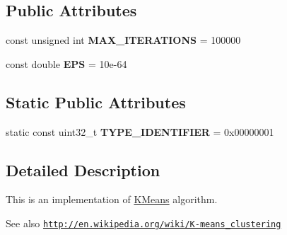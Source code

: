 \subsection*{Public Attributes}
\begin{DoxyCompactItemize}
\item 
\hypertarget{classspeech_1_1clustering_1_1KMeans_a23ff9ad53e6d3db5d933ca6369d36ebe}{const unsigned int {\bfseries M\+A\+X\+\_\+\+I\+T\+E\+R\+A\+T\+I\+O\+N\+S} = 100000}\label{classspeech_1_1clustering_1_1KMeans_a23ff9ad53e6d3db5d933ca6369d36ebe}

\item 
\hypertarget{classspeech_1_1clustering_1_1KMeans_a51592e6258feb92faf71ed61a083596a}{const double {\bfseries E\+P\+S} = 10e-\/64}\label{classspeech_1_1clustering_1_1KMeans_a51592e6258feb92faf71ed61a083596a}

\end{DoxyCompactItemize}
\subsection*{Static Public Attributes}
\begin{DoxyCompactItemize}
\item 
\hypertarget{classspeech_1_1clustering_1_1KMeans_a2643066179760a8455dc118e860a9c5d}{static const uint32\+\_\+t {\bfseries T\+Y\+P\+E\+\_\+\+I\+D\+E\+N\+T\+I\+F\+I\+E\+R} = 0x00000001}\label{classspeech_1_1clustering_1_1KMeans_a2643066179760a8455dc118e860a9c5d}

\end{DoxyCompactItemize}


\subsection{Detailed Description}
This is an implementation of \hyperlink{classspeech_1_1clustering_1_1KMeans}{K\+Means} algorithm. \begin{DoxySeeAlso}{See also}
\href{http://en.wikipedia.org/wiki/K-means_clustering}{\tt http\+://en.\+wikipedia.\+org/wiki/\+K-\/means\+\_\+clustering} 
\end{DoxySeeAlso}


